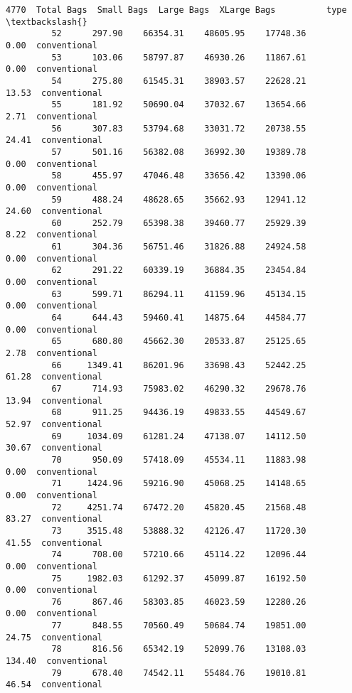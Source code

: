 \documentclass[11pt]{article}
\begin{document}
\begin{Verbatim}[commandchars=\\\{\}]
                   4770  Total Bags  Small Bags  Large Bags  XLarge Bags          type  \textbackslash{}
         52      297.90    66354.31    48605.95    17748.36         0.00  conventional   
         53      103.06    58797.87    46930.26    11867.61         0.00  conventional   
         54      275.80    61545.31    38903.57    22628.21        13.53  conventional   
         55      181.92    50690.04    37032.67    13654.66         2.71  conventional   
         56      307.83    53794.68    33031.72    20738.55        24.41  conventional   
         57      501.16    56382.08    36992.30    19389.78         0.00  conventional   
         58      455.97    47046.48    33656.42    13390.06         0.00  conventional   
         59      488.24    48628.65    35662.93    12941.12        24.60  conventional   
         60      252.79    65398.38    39460.77    25929.39         8.22  conventional   
         61      304.36    56751.46    31826.88    24924.58         0.00  conventional   
         62      291.22    60339.19    36884.35    23454.84         0.00  conventional   
         63      599.71    86294.11    41159.96    45134.15         0.00  conventional   
         64      644.43    59460.41    14875.64    44584.77         0.00  conventional   
         65      680.80    45662.30    20533.87    25125.65         2.78  conventional   
         66     1349.41    86201.96    33698.43    52442.25        61.28  conventional   
         67      714.93    75983.02    46290.32    29678.76        13.94  conventional   
         68      911.25    94436.19    49833.55    44549.67        52.97  conventional   
         69     1034.09    61281.24    47138.07    14112.50        30.67  conventional   
         70      950.09    57418.09    45534.11    11883.98         0.00  conventional   
         71     1424.96    59216.90    45068.25    14148.65         0.00  conventional   
         72     4251.74    67472.20    45820.45    21568.48        83.27  conventional   
         73     3515.48    53888.32    42126.47    11720.30        41.55  conventional   
         74      708.00    57210.66    45114.22    12096.44         0.00  conventional   
         75     1982.03    61292.37    45099.87    16192.50         0.00  conventional   
         76      867.46    58303.85    46023.59    12280.26         0.00  conventional   
         77      848.55    70560.49    50684.74    19851.00        24.75  conventional   
         78      816.56    65342.19    52099.76    13108.03       134.40  conventional   
         79      678.40    74542.11    55484.76    19010.81        46.54  conventional   

\end{Verbatim}
\end{document}
